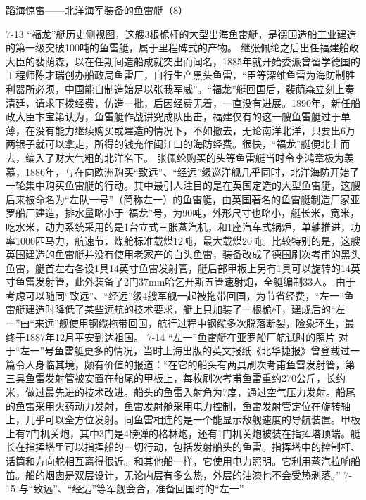 \documentclass[12pt,UTF8]{ctexbook}
\begin{document}
蹈海惊雷——北洋海军装备的鱼雷艇（8）

7-13
“福龙”艇历史侧视图，这艘3根桅杆的大型出海鱼雷艇，是德国造船工业建造的第一级突破100吨的鱼雷艇，属于里程碑式的产物。
继张佩纶之后出任福建船政大臣的裴荫森，以在任期间造船成就突出而闻名，1885年就开始委派曾留学德国的工程师陈才瑞创办船政局鱼雷厂，自行生产黑头鱼雷，“臣等深维鱼雷为海防制胜利器所必须，中国能自制造始足以张我军威”。“福龙”艇回国后，裴荫森立刻上奏清廷，请求下拨经费，仿造一批，后因经费无着，一直没有进展。1890年，新任船政大臣卞宝第认为，鱼雷艇作战讲究成队出击，福建仅有的这一艘鱼雷艇过于单薄，在没有能力继续购买或建造的情况下，不如撤去，无论南洋北洋，只要出6万两银子就可以拿走，所得的钱充作闽江口的海防经费。很快，“福龙”艇便北上而去，编入了财大气粗的北洋名下。
张佩纶购买的头等鱼雷艇当时令李鸿章极为羡慕，1886年，与在向欧洲购买“致远”、“经远”级巡洋舰几乎同时，北洋海防开始了一轮集中购买鱼雷艇的行动。其中最引人注目的是在英国定造的大型鱼雷艇，这艘后来被命名为“左队一号”（简称左一）的鱼雷艇，由英国著名的鱼雷艇制造厂家亚罗船厂建造，排水量略小于“福龙”号，为90吨，外形尺寸也略小，艇长米，宽米，吃水米，动力系统采用的是1台立式三胀蒸汽机，和1座汽车式锅炉，单轴推进，功率1000匹马力，航速节，煤舱标准载煤12吨，最大载煤20吨。比较特别的是，这艘英国建造的鱼雷艇并没有使用老家产的白头鱼雷，装备改成了德国刷次考甫的黑头鱼雷，艇首左右各设1具14英寸鱼雷发射管，艇后部甲板上另有1具可以旋转的14英寸鱼雷发射管，此外装备了2门37mm哈乞开斯五管速射炮，全艇编制33人。 由于考虑可以随同“致远”、“经远”级4艘军舰一起被拖带回国，为节省经费，“左一”鱼雷艇建造时降低了某些远航的技术要求，艇上只加装了一根桅杆，建成后的“左一”由“来远”舰使用钢缆拖带回国，航行过程中钢缆多次脱落断裂，险象环生，最终于1887年12月平安到达祖国。
7-14 “左一”鱼雷艇在亚罗船厂航试时的照片
对于“左一”号鱼雷艇更多的情况，当时上海出版的英文报纸《北华捷报》曾登载过一篇令人身临其境，颇有价值的报道：“在它的船头有两具刷次考甫鱼雷发射管，第三具鱼雷发射管被安置在船尾的甲板上，每枚刷次考甫鱼雷重约270公斤，长约米，做过最先进的技术改进。船头的鱼雷入射角为7度，通过空气压力发射。船尾的鱼雷采用火药动力发射，鱼雷发射舱采用电力控制，鱼雷发射管定位在旋转轴上，几乎可以全方位发射。同鱼雷相连的是一个能显示敌舰速度的导航装置。甲板上有7门机关炮，其中3门是4磅弹的格林炮，还有1门机关炮被装在指挥塔顶端。艇长在指挥塔里可以指挥船的一切行动，包括发射船头的鱼雷。指挥塔中的控制杆、话筒和方向舵相互离得很近。和其他船一样，它使用电力照明。它利用蒸汽拉响船笛。船的烟囱是双层设计，无论内层有多么热，外层的油漆也不会受热剥落。”
7-15 与“致远”、“经远”等军舰会合，准备回国时的“左一”
\end{document}

